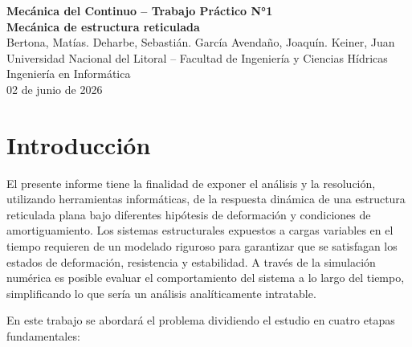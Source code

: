 \documentclass[12pt]{article}
\begin{document}
\begin{center}
    \vspace*{10mm}
    {\Huge\bfseries Mecánica del Continuo -- Trabajo Práctico N°1} \\[4mm]
    {\large\bfseries  Mecánica de estructura reticulada} \\[15mm]

    {\LARGE Bertona, Matías. Deharbe, Sebastián. García Avendaño, Joaquín. Keiner, Juan} \\[5mm]
    {\large Universidad Nacional del Litoral -- Facultad de Ingeniería y Ciencias Hídricas} \\[3mm]
    {\large Ingeniería en Informática} \\[6mm]
    {\large 02 de junio de 2026}
    \vspace*{15mm}
\end{center}

\newpage
\tableofcontents
\newpage

\section{Introducción}

El presente informe tiene la finalidad de exponer el análisis y la resolución, utilizando herramientas informáticas, de la respuesta dinámica de una estructura reticulada plana bajo diferentes hipótesis de deformación y condiciones de amortiguamiento.
Los sistemas estructurales expuestos a cargas variables en el tiempo requieren de un modelado riguroso para garantizar que se satisfagan los estados de deformación, resistencia y estabilidad. A través de la simulación numérica es posible evaluar el comportamiento del sistema a lo largo del tiempo, simplificando lo que sería un análisis analíticamente intratable.

En este trabajo se abordará el problema dividiendo el estudio en cuatro etapas fundamentales:
\end{document}
